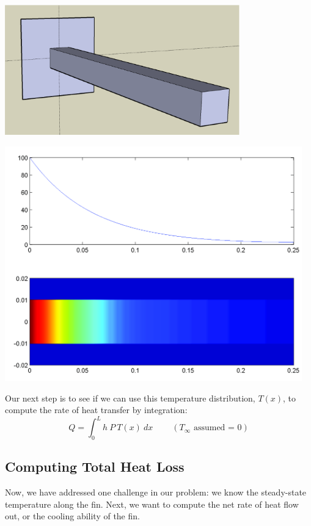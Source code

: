 \begin{center}
\begin{minipage}{4.0in}
\includegraphics[width=4.0in]{graphics/notes_06_LongPin3D}
\end{minipage}
\begin{minipage}{4.0in}
\begin{center}
\includegraphics[height=4.0in]{graphics/notes_06_FinTemperature1}
\end{center}
\end{minipage}
\end{center}

Our next step is to see if we can use this temperature distribution,
$T(x)$, to compute the rate of heat transfer by integration:
$$
Q = \int_0^{L} h ~P ~T(x) ~dx   ~~~~~~~~~~ (T_\infty \mbox{ assumed = 0})
$$


\newpage


\subsection*{Computing Total Heat Loss}
Now, we have addressed one challenge in our problem: we know the
steady-state temperature along the fin.  Next, we want to compute
the net rate of heat flow out, or the cooling ability of the fin.

